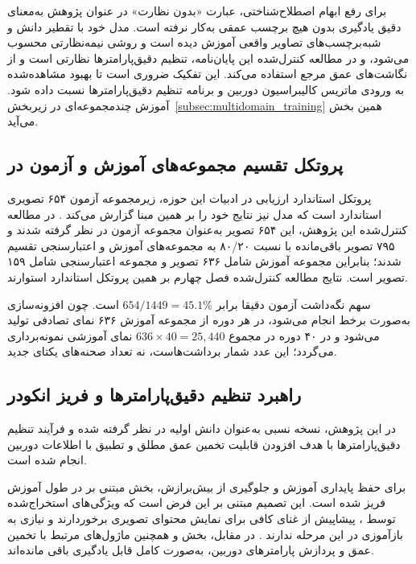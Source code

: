 برای رفع ابهام اصطلاح‌شناختی، عبارت «بدون نظارت» در عنوان پژوهش به‌معنای دقیق یادگیری بدون هیچ برچسب عمقی به‌کار نرفته است. مدل \basemodel{} خود با تقطیر دانش و شبه‌برچسب‌های تصاویر واقعی آموزش دیده است و روشی نیمه‌نظارتی محسوب می‌شود، و در مطالعه کنترل‌شده این پایان‌نامه، تنظیم دقیق‌پارامترها نظارتی است و از نگاشت‌های عمق مرجع  استفاده می‌کند. این تفکیک ضروری است تا بهبود مشاهده‌شده به ورودی ماتریس کالیبراسیون دوربین و برنامه تنظیم دقیق‌پارامترها نسبت داده شود. آموزش چندمجموعه‌ای در زیربخش~{\ref{subsec:multidomain_training}} همین بخش می‌آید.

\subsection{پروتکل تقسیم مجموعه‌های آموزش و آزمون در }
\label{subsec:nyuv2_split}

پروتکل استاندارد ارزیابی در ادبیات این حوزه، زیرمجموعه آزمون ۶۵۴ تصویری استاندارد  است \cite{Eigen2014Depth} که مدل  نیز نتایج خود را بر همین مبنا گزارش می‌کند \cite{DepthAnythingV2}. در مطالعه کنترل‌شده این پژوهش، این ۶۵۴ تصویر به‌عنوان مجموعه آزمون در نظر گرفته شدند و ۷۹۵ تصویر باقی‌مانده با نسبت ۸۰/۲۰ به مجموعه‌های آموزش و اعتبارسنجی تقسیم شدند؛ بنابراین مجموعه آموزش شامل ۶۳۶ تصویر و مجموعه اعتبارسنجی شامل ۱۵۹ تصویر است. نتایج مطالعه کنترل‌شده فصل چهارم بر همین پروتکل استاندارد استوارند.

سهم نگه‌داشت آزمون دقیقا برابر \(654/1449=45.1\%\) است. چون افزونه‌سازی به‌صورت برخط انجام می‌شود، در هر دوره از مجموعه آموزش ۶۳۶ نمای تصادفی تولید می‌شود و در ۴۰ دوره در مجموع \(636\times40=25{,}440\) نمای آموزشی نمونه‌برداری می‌گردد؛ این عدد شمار برداشت‌هاست، نه تعداد صحنه‌های یکتای جدید.

\subsection[راهبرد تنظیم دقیق‌پارامترها و فریز انکودر]{ راهبرد تنظیم دقیق‌پارامترها و فریز انکودر}

در این پژوهش، نسخه نسبی {\basemodel{}} به‌عنوان دانش اولیه در نظر گرفته شده و فرآیند تنظیم دقیق‌پارامترها با هدف افزودن قابلیت تخمین عمق مطلق و تطبیق با اطلاعات دوربین انجام شده است.

برای حفظ پایداری آموزش و جلوگیری از بیش‌برازش، بخش  مبتنی بر  در طول آموزش فریز شده است. این تصمیم مبتنی بر این فرض است که ویژگی‌های استخراج‌شده توسط ، پیشاپیش از غنای کافی برای نمایش محتوای تصویری برخوردارند و نیازی به بازآموزی در این مرحله ندارند \cite{Oquab2023DINOv2}. در مقابل، بخش  و همچنین ماژول‌های مرتبط با تخمین عمق و پردازش پارامترهای دوربین، به‌صورت کامل قابل یادگیری باقی مانده‌اند.


